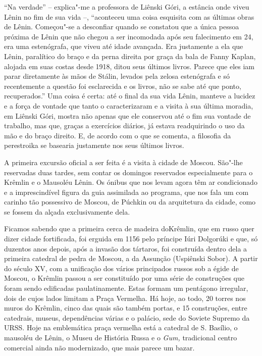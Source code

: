 ``Na verdade'' -- explica"-me a professora de Liênski Góri, a estância
onde viveu Lênin no fim de sua vida --, ``aconteceu uma coisa esquisita
com as últimas obras de Lênin. Começou"-se a desconfiar quando se
constatou que a única pessoa próxima de Lênin que não chegou a ser
incomodada após seu falecimento em 24, era uma estenógrafa, que viveu
até idade avançada. Era justamente a ela que Lênin, paralítico do braço
e da perna direita por graça da bala de Fanny Kaplan, alojada em suas
costas desde 1918, ditou seus últimos livros. Parece que eles iam parar
diretamente às mãos de Stálin, levados pela zelosa estenógrafa e só
recentemente a questão foi esclarecida e os livros, não se sabe até que
ponto, recuperados.'' Uma coisa é certa: até o final da sua vida Lênin,
manteve a lucidez e a força de vontade que tanto o caracterizaram e a
visita à sua última moradia, em Liênski Góri, mostra não apenas que ele
conservou até o fim sua vontade de trabalho, mas que, graças a
exercícios diários, já estava readquirindo o uso da mão e do braço
direito. E, de acordo com o que se comenta, a filosofia da perestroika
se basearia justamente nos seus últimos livros.

A primeira excursão oficial a ser feita é a visita à cidade de Moscou.
São"-lhe reservadas duas tardes, sem contar os domingos reservados
especialmente para o Krêmlin e o Mausoléu Lênin. Os ónibus que nos levam
agora têm ar condicionado e a imprescindível figura da guia assimilada
ao programa, que nos fala um com carinho tão possessivo de Moscou, de
Púchkin ou da arquitetura da cidade, como se fossem da alçada
exclusivamente dela.

Ficamos sabendo que a primeira cerca de madeira doKrêmlin, que em russo
quer dizer cidade fortificada, foi erguida em 1156 pelo príncipe Iúri
Dolgorúki e que, só duzentos anos depois, após a invasão dos tártaros,
foi construída dentro dela a primeira catedral de pedra de Moscou, a da
Assunção (Uspiênski Sobor). A partir do século XV, com a unificação dos
vários principados russos sob a égide de Moscou, o Krêmlin passou a ser
constituído por uma série de construções que foram sendo edificadas
paulatinamente. Estas formam um pentágono irregular, dois de cujos lados
limitam a Praça Vermelha. Há hoje, ao todo, 20 torres nos muros do
Krêmlin, cinco das quais são também portas, e 15 construções, entre
catedrais, museus, dependências várias e o palácio, sede do Soviete
Supremo da URSS. Hoje na emblemática praça vermelha está a catedral de
S. Basílio, o mausoléu de Lênin, o Museu de História Russa e o
\emph{Gum,} tradicional centro comercial ainda não modernizado, que mais
parece um bazar.

